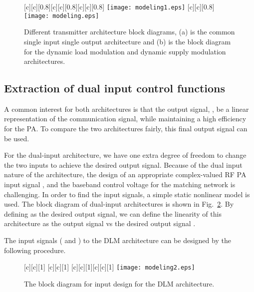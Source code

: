 \documentclass[10pt,journal]{IEEEtran}
\begin{document}
\begin{figure}
\centering
{}[c][c][0.8]{}[c][c][0.8]{}[c][c][0.8]{}
\subfigure[]{\label{fig:SISO}}\texttt{[image: modeling1.eps]}
[c][c][0.8]{}
\subfigure[]{\label{fig:MISO}}\texttt{[image: modeling.eps]}
\caption{Different transmitter architecture block diagrams, (a) is the common single input single output architecture and (b) is the block diagram for the dynamic load modulation and dynamic supply modulation architectures.}
\label{tranblock}
\end{figure}

\subsection{Extraction of dual input control functions}

A common interest for both architectures is that the output signal, , be a linear representation of the communication signal, while maintaining a high efficiency for the PA. To compare the two architectures fairly, this final output signal  can be used.

For the dual-input architecture, we have one extra degree of freedom to change the two inputs to achieve the desired output signal. Because of the dual input nature of the architecture, the design of an appropriate complex-valued RF PA input signal , and the baseband control voltage  for the matching network is challenging. In order to find the input signals, a simple static nonlinear model is used. The block diagram of dual-input architectures is shown in Fig.~\ref{modeling2}. By defining  as the desired output signal, we can define the linearity of this architecture as the output signal  vs the desired output signal .

The input signals ( and ) to the DLM architecture can be designed by the following procedure.

\begin{figure}
\centering {}[c][c][1]{} [c][c][1]{}
[c][c][1]{}[c][c][1]{}
\texttt{[image: modeling2.eps]}
\caption{The block diagram for input design for the DLM architecture.}
\label{modeling2}
\end{figure}
\end{document}
